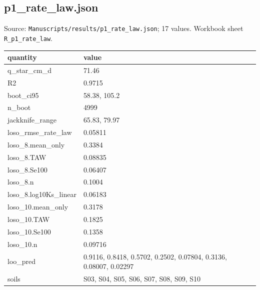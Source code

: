 \subsection*{p1\_rate\_law.json}
\noindent\small Source: \nolinkurl{Manuscripts/results/p1_rate_law.json}; 17 values. Workbook sheet \texttt{R\_p1\_rate\_law}.\par
{\scriptsize\begin{longtable}{p{}p{}}\toprule\textbf{quantity} & \textbf{value}\\\midrule\endhead
{}q\_star\_cm\_d & 71.46\\
{}R2 & 0.9715\\
{}boot\_ci95 & 58.38, 105.2\\
{}n\_boot & 4999\\
{}jackknife\_range & 65.83, 79.97\\
{}loso\_rmse\_rate\_law & 0.05811\\
{}loso\_8.mean\_only & 0.3384\\
{}loso\_8.TAW & 0.08835\\
{}loso\_8.Se100 & 0.06407\\
{}loso\_8.n & 0.1004\\
{}loso\_8.log10Ks\_linear & 0.06183\\
{}loso\_10.mean\_only & 0.3178\\
{}loso\_10.TAW & 0.1825\\
{}loso\_10.Se100 & 0.1358\\
{}loso\_10.n & 0.09716\\
{}loo\_pred & 0.9116, 0.8418, 0.5702, 0.2502, 0.07804, 0.3136, 0.08007, 0.02297\\
{}soils & S03, S04, S05, S06, S07, S08, S09, S10\\
\bottomrule\end{longtable}}

